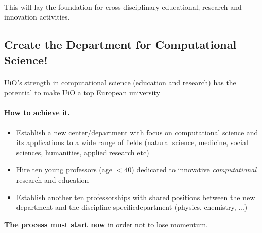 \documentclass[%
twoside,                 %
final,                   %
10pt]{article}
\begin{document}
\paragraph{}
This will lay the foundation for cross-disciplinary
educational, research and innovation activities.







\subsection*{Create the Department for Computational Science!}


\paragraph{}
UiO's strength in computational science (education and research)
has the potential to make UiO a top European university




\paragraph{How to achieve it.}
\begin{itemize}
\item Establish  a new center/department with focus on computational science and its applications to a wide range of fields (natural science, medicine, social sciences, humanities, applied research etc)

\item Hire ten young professors (age $< 40$) dedicated to innovative \emph{computational} research and education

\item Establish another ten professorships with  shared positions between the  new department and the discipline-specificdepartment (physics, chemistry, ...)
\end{itemize}

\noindent



\textbf{The process must start now} in order not to lose momentum.
\end{document}
